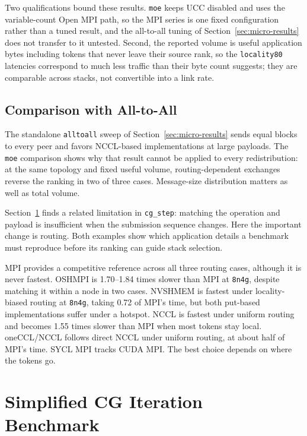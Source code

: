 Two qualifications bound these results. \texttt{moe} keeps UCC disabled and uses the variable-count Open MPI path, so the MPI series is one fixed configuration rather than a tuned result, and the all-to-all tuning of Section~\ref{sec:micro-results} does not transfer to it untested. Second, the reported volume is useful application bytes including tokens that never leave their source rank, so the \texttt{locality80} latencies correspond to much less traffic than their byte count suggests; they are comparable across stacks, not convertible into a link rate.

\subsection{Comparison with All-to-All}

The standalone \texttt{alltoall} sweep of Section~\ref{sec:micro-results} sends equal blocks to every peer and favors NCCL-based implementations at large payloads. The \texttt{moe} comparison shows why that result cannot be applied to every redistribution: at the same topology and fixed useful volume, routing-dependent exchanges reverse the ranking in two of three cases. Message-size distribution matters as well as total volume.

Section~\ref{sec:cg-step-results} finds a related limitation in \texttt{cg\_step}: matching the operation and payload is insufficient when the submission sequence changes. Here the important change is routing. Both examples show which application details a benchmark must reproduce before its ranking can guide stack selection.

\begin{keypoint}
MPI provides a competitive reference across all three routing cases, although it is never fastest. OSHMPI is 1.70--1.84 times slower than MPI at \texttt{8n4g}, despite matching it within a node in two cases. NVSHMEM is fastest under locality-biased routing at \texttt{8n4g}, taking 0.72 of MPI's time, but both put-based implementations suffer under a hotspot. NCCL is fastest under uniform routing and becomes 1.55 times slower than MPI when most tokens stay local. oneCCL/NCCL follows direct NCCL under uniform routing, at about half of MPI's time. SYCL MPI tracks CUDA MPI. The best choice depends on where the tokens go.
\end{keypoint}

\section{Simplified CG Iteration Benchmark}\label{sec:cg-step-results}

